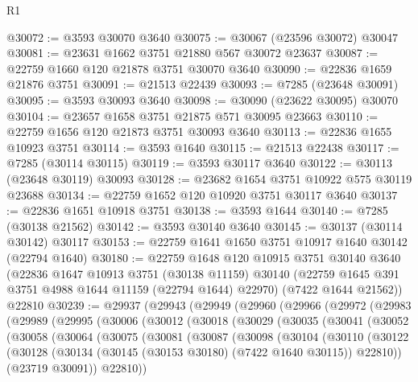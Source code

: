 \begin{lexlean}{R1}
\begin{coremodule}
@30072 := @3593 @30070 @3640
@30075 := @30067 (@23596 @30072) @30047
@30081 := @23631 @1662 @3751 @21880 @567 @30072 @23637
@30087 := @22759 @1660 @120 @21878 @3751 @30070 @3640
@30090 := @22836 @1659 @21876 @3751
@30091 := @21513 @22439
@30093 := @7285 (@23648 @30091)
@30095 := @3593 @30093 @3640
@30098 := @30090 (@23622 @30095) @30070
@30104 := @23657 @1658 @3751 @21875 @571 @30095 @23663
@30110 := @22759 @1656 @120 @21873 @3751 @30093 @3640
@30113 := @22836 @1655 @10923 @3751
@30114 := @3593 @1640
@30115 := @21513 @22438
@30117 := @7285 (@30114 @30115)
@30119 := @3593 @30117 @3640
@30122 := @30113 (@23648 @30119) @30093
@30128 := @23682 @1654 @3751 @10922 @575 @30119 @23688
@30134 := @22759 @1652 @120 @10920 @3751 @30117 @3640
@30137 := @22836 @1651 @10918 @3751
@30138 := @3593 @1644
@30140 := @7285 (@30138 @21562)
@30142 := @3593 @30140 @3640
@30145 := @30137 (@30114 @30142) @30117
@30153 := @22759 @1641 @1650 @3751 @10917 @1640 @30142 (@22794 @1640)
@30180 := @22759
    @1648
    @120
    @10915
    @3751
    @30140
    @3640
    (@22836
      @1647
      @10913
      @3751
      (@30138 @11159)
      @30140
      (@22759 @1645 @391 @3751 @4988 @1644 @11159 (@22794 @1644) @22970)
      (@7422 @1644 @21562))
    @22810
@30239 := @29937
    (@29943
      (@29949
        (@29960
          (@29966
            (@29972
              (@29983
                (@29989
                  (@29995
                    (@30006
                      (@30012
                        (@30018
                          (@30029
                            (@30035
                              (@30041
                                (@30052
                                  (@30058
                                    (@30064
                                      (@30075
                                        (@30081
                                          (@30087
                                            (@30098
                                              (@30104
                                                (@30110
                                                  (@30122
                                                    (@30128
                                                      (@30134
                                                        (@30145
                                                          (@30153 @30180)
                                                          (@7422 @1640 @30115))
                                                        @22810))
                                                    (@23719 @30091))
                                                  @22810))

\end{coremodule}
\end{lexlean}

